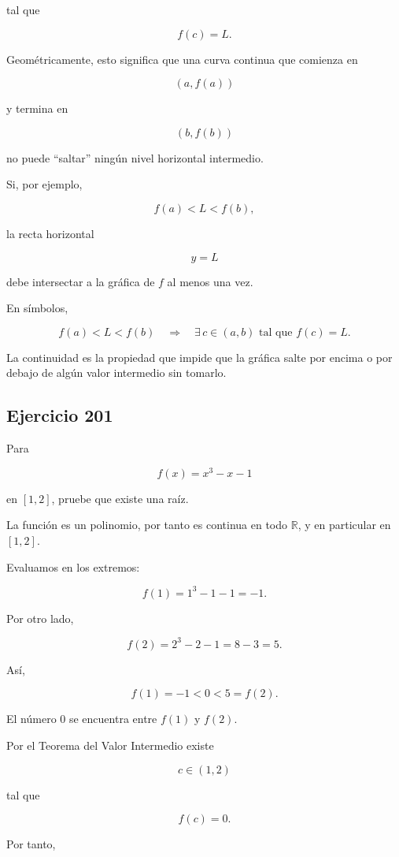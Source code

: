 \documentclass[12pt]{article}
\begin{document}
tal que

\[
f(c)=L.
\]

Geométricamente, esto significa que una curva continua que comienza en

\[
(a,f(a))
\]

y termina en

\[
(b,f(b))
\]

no puede ``saltar'' ningún nivel horizontal intermedio.

Si, por ejemplo,

\[
f(a)<L<f(b),
\]

la recta horizontal

\[
y=L
\]

debe intersectar a la gráfica de \(f\) al menos una vez.

En símbolos,

\[
\boxed{
f(a)<L<f(b)
\quad\Longrightarrow\quad
\exists\,c\in(a,b)
\text{ tal que }f(c)=L
}.
\]

La continuidad es la propiedad que impide que la gráfica salte por
encima o por debajo de algún valor intermedio sin tomarlo.

\subsection*{Ejercicio 201}

Para

\[
f(x)=x^3-x-1
\]

en \([1,2]\), pruebe que existe una raíz.

La función es un polinomio, por tanto es continua en todo
\(\mathbb{R}\), y en particular en \([1,2]\).

Evaluamos en los extremos:

\[
f(1)=1^3-1-1=-1.
\]

Por otro lado,

\[
f(2)=2^3-2-1=8-3=5.
\]

Así,

\[
f(1)=-1<0<5=f(2).
\]

El número \(0\) se encuentra entre \(f(1)\) y \(f(2)\).

Por el Teorema del Valor Intermedio existe

\[
c\in(1,2)
\]

tal que

\[
f(c)=0.
\]

Por tanto,
\end{document}
